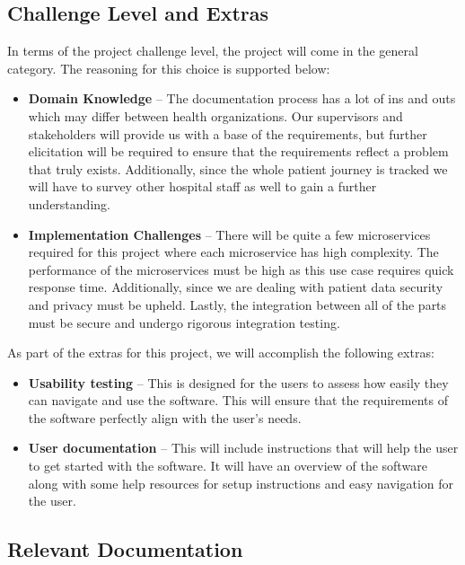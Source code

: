 \documentclass[12pt, titlepage]{article}
\begin{document}
\subsection{Challenge Level and Extras} \label{section:2.3}

In terms of the project challenge level, the project will come in the general category. The reasoning for this choice is supported below:

\begin{itemize}
  \item\textbf{Domain Knowledge} -- The documentation process has a lot of ins and outs which may differ between health organizations. Our supervisors and stakeholders will provide us with a base of the requirements, but further elicitation will be required to ensure that the requirements reflect a problem that truly exists. Additionally, since the whole patient journey is tracked we will have to survey other hospital staff as well to gain a further understanding. 
  \item\textbf{Implementation Challenges} -- There will be quite a few microservices required for this project where each microservice has high complexity. The performance of the microservices must be high as this use case requires quick response time. Additionally, since we are dealing with patient data security and privacy must be upheld. Lastly, the integration between all of the parts must be secure and undergo rigorous integration testing.
\end{itemize}

As part of the extras for this project, we will accomplish the following extras:

\begin{itemize}
  \item \textbf{Usability testing} -- This is designed for the users to assess how easily they can navigate and use the software. This will ensure that the requirements of the software perfectly align with the user's needs.
  \item \textbf{User documentation} -- This will include instructions that will help the user to get started with the software. It will have an overview of the software along with some help resources for setup instructions and easy navigation for the user.
\end{itemize}

\subsection{Relevant Documentation} \label{section:2.4}
\end{document}
